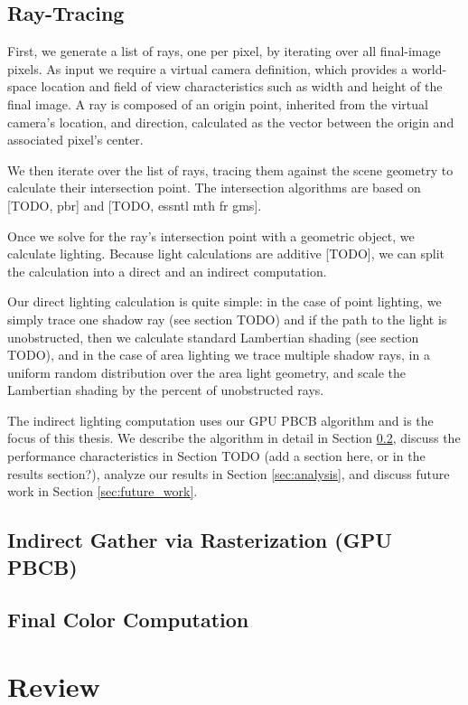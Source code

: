 \subsection{Ray-Tracing}
First, we generate a list of rays, one per pixel, by iterating over all final-image pixels. As input we require a virtual camera definition, which provides a world-space location and field of view characteristics such as width and height of the final image. A ray is composed of an origin point, inherited from the virtual camera's location, and direction, calculated as the vector between the origin and associated pixel's center.

We then iterate over the list of rays, tracing them against the scene geometry to calculate their intersection point. The intersection algorithms are based on [TODO, pbr] and [TODO, essntl mth fr gms].

Once we solve for the ray's intersection point with a geometric object, we calculate lighting. Because light calculations are additive [TODO], we can split the calculation into a direct and an indirect computation.

Our direct lighting calculation is quite simple: in the case of point lighting, we simply trace one shadow ray (see section TODO) and if the path to the light is unobstructed, then we calculate standard Lambertian shading (see section TODO), and in the case of area lighting we trace multiple shadow rays, in a uniform random distribution over the area light geometry, and scale the Lambertian shading by the percent of unobstructed rays.

The indirect lighting computation uses our GPU PBCB algorithm and is the focus of this thesis. We describe the algorithm in detail in Section \ref{sec:indirect}, discuss the performance characteristics in Section TODO (add a section here, or in the results section?), analyze our results in Section \ref{sec:analysis}, and discuss future work in Section \ref{sec:future_work}.

\subsection{Indirect Gather via Rasterization (GPU PBCB)}
\label{sec:indirect}

\subsection{Final Color Computation}

\section{Review}

